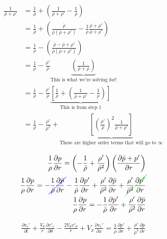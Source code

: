 \begin{align*}
\frac{1}{\bar{\rho} + \rho'} 
&= \frac{1}{\bar{\rho}} 
+ \left(
\frac{1}{\bar{\rho} 
	+ \rho'} 
- \frac{1}{\rho}
\right) \\
&= \frac{1}{\bar{\rho}} 
+ \left(
\frac{\bar{\rho}}{\bar{\rho}(\bar{\rho} 
	+ \rho')} 
- \frac{1}{\rho} \frac{\bar{\rho} + \rho'}{\bar{\rho} + \rho'}
\right) \\
&= \frac{1}{\bar{\rho}} 
- \left(
\frac{\bar{\rho} - \bar{\rho} + \rho'}{\bar{\rho}(\bar{\rho} 
	+ \rho')}
\right)	\\
&= \frac{1}{\bar{\rho}} 
- \frac{\rho'}{\bar{\rho}}
\underbrace{\left(
	\frac{1}{\bar{\rho} + \rho}
	\right)}_\text{This is what we're solving for!}	\\
&= \frac{1}{\bar{\rho}} 
- \frac{\rho'}{\bar{\rho}}
\underbrace{
	\left[\frac{1}{\bar{\rho}} 
	+ \left(
	\frac{1}{\bar{\rho} 
		+ \rho'} 
	- \frac{1}{\rho}
	\right) \right] }_\text{This is from step 1}	\\
&= \frac{1}{\bar{\rho}} 
- \frac{\rho'}{\bar{\rho}^2} +
\underbrace{
	\left[ \left(\frac{\rho'}{\bar{\rho}}\right)^2
	\frac{1}{\bar{\rho} 
		+ \rho'} 
	\right] }_\text{These are higher order terms that will go to $\infty$}	\\	
\end{align*}
\begin{align*} %
\frac{1}{\rho}\frac{\partial p}{\partial r} = \left( -\frac{1    }{\bar{\rho}} +
\frac{\rho'}{\bar{\rho}^2}\right) \left(\frac{\partial \bar{p} + p'}{\partial r}\right)\\
\frac{1}{\rho}\frac{\partial p}{\partial r} =  -\Ccancel[blue]{\frac{1    }{\bar{\rho}}  \frac{\partial \bar{p}}{\partial r}} -  
\frac{1    }{\bar{\rho}}  \frac{\partial p'}{\partial r} +
\frac{\rho'}{\bar{\rho}^2}\frac{\partial \bar{p}}{\partial r} +
\Ccancel[green]{\frac{\rho'}{\bar{\rho}^2}\frac{\partial p'}{\partial r}}\\
\frac{1}{\rho}\frac{\partial p}{\partial r} =  -\frac{1    }{\bar{\rho}}  \frac{\partial p'}{\partial r} +
\frac{\rho'}{\bar{\rho}^2}\frac{\partial \bar{p}}{\partial r} 
\end{align*}

\begin{align*}
\boxed{
	\frac{\partial  v_r' }{\partial t} +
	\frac{V_{\theta}}{r} \frac{\partial v'_r}{\partial \theta} -
	\frac{2V_{\theta}v'_{\theta}}{r} +
	V_x \frac{\partial v_r'}{\partial x} =\frac{1    }{\bar{\rho}}  \frac{\partial p'}{\partial r} +
	\frac{\rho'}{\bar{\rho}^2}\frac{\partial \bar{p}}{\partial r} 
}
\end{align*}
\newpage
